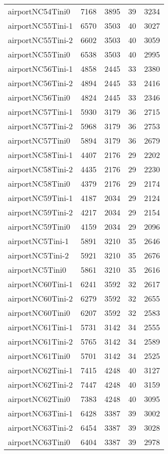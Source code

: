 \begin{longtable}{lrrrr}
airportNC54Tini0 & 7168 & 3895 & 39 & 3234 \\
airportNC55Tini-1 & 6570 & 3503 & 40 & 3027 \\
airportNC55Tini-2 & 6602 & 3503 & 40 & 3059 \\
airportNC55Tini0 & 6538 & 3503 & 40 & 2995 \\
airportNC56Tini-1 & 4858 & 2445 & 33 & 2380 \\
airportNC56Tini-2 & 4894 & 2445 & 33 & 2416 \\
airportNC56Tini0 & 4824 & 2445 & 33 & 2346 \\
airportNC57Tini-1 & 5930 & 3179 & 36 & 2715 \\
airportNC57Tini-2 & 5968 & 3179 & 36 & 2753 \\
airportNC57Tini0 & 5894 & 3179 & 36 & 2679 \\
airportNC58Tini-1 & 4407 & 2176 & 29 & 2202 \\
airportNC58Tini-2 & 4435 & 2176 & 29 & 2230 \\
airportNC58Tini0 & 4379 & 2176 & 29 & 2174 \\
airportNC59Tini-1 & 4187 & 2034 & 29 & 2124 \\
airportNC59Tini-2 & 4217 & 2034 & 29 & 2154 \\
airportNC59Tini0 & 4159 & 2034 & 29 & 2096 \\
airportNC5Tini-1 & 5891 & 3210 & 35 & 2646 \\
airportNC5Tini-2 & 5921 & 3210 & 35 & 2676 \\
airportNC5Tini0 & 5861 & 3210 & 35 & 2616 \\
airportNC60Tini-1 & 6241 & 3592 & 32 & 2617 \\
airportNC60Tini-2 & 6279 & 3592 & 32 & 2655 \\
airportNC60Tini0 & 6207 & 3592 & 32 & 2583 \\
airportNC61Tini-1 & 5731 & 3142 & 34 & 2555 \\
airportNC61Tini-2 & 5765 & 3142 & 34 & 2589 \\
airportNC61Tini0 & 5701 & 3142 & 34 & 2525 \\
airportNC62Tini-1 & 7415 & 4248 & 40 & 3127 \\
airportNC62Tini-2 & 7447 & 4248 & 40 & 3159 \\
airportNC62Tini0 & 7383 & 4248 & 40 & 3095 \\
airportNC63Tini-1 & 6428 & 3387 & 39 & 3002 \\
airportNC63Tini-2 & 6454 & 3387 & 39 & 3028 \\
airportNC63Tini0 & 6404 & 3387 & 39 & 2978 \\

\end{longtable}
